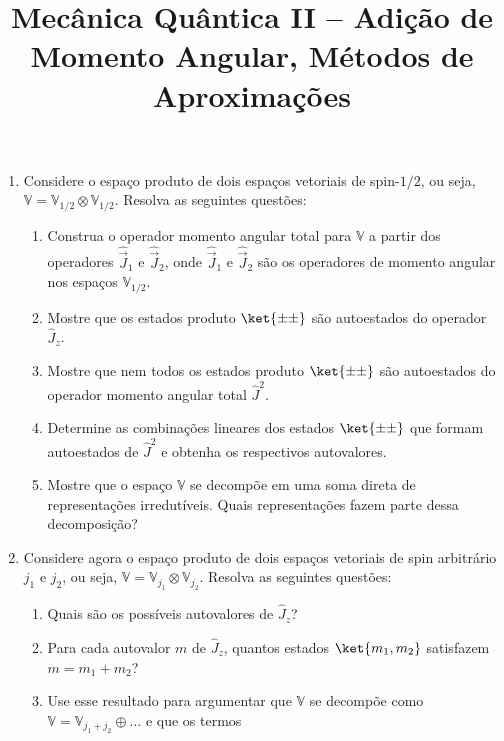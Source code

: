 \newif\ifuseseminar
\useseminartrue


\title{Mecânica Quântica II -- Adição de Momento Angular, Métodos de Aproximações}



\begin{enumerate}
	\item Considere o espaço produto de dois espaços vetoriais de spin-$1/2$, ou seja,
	      $\mathbb{V} = \mathbb{V}_{1/2} \otimes \mathbb{V}_{1/2}$. Resolva as seguintes
	      questões:
	      \begin{enumerate}
		      \item Construa o operador momento angular total para $\mathbb{V}$ a partir
		            dos operadores $\hat{\vec{J}}_1$ e $\hat{\vec{J}}_2$, onde
		            $\hat{\vec{J}}_1$ e $\hat{\vec{J}}_2$ são os operadores de momento
		            angular nos espaços $\mathbb{V}_{1/2}$.
		      \item Mostre que os estados produto $\ket{\pm \pm}$ são autoestados do
		            operador $\hat{J}_z$.
		      \item Mostre que nem todos os estados produto $\ket{\pm \pm}$ são
		            autoestados do operador momento angular total $\hat{J}^2$.
		      \item Determine as combinações lineares dos estados $\ket{\pm \pm}$ que formam
		            autoestados de $\hat{J}^2$ e obtenha os respectivos autovalores.
		      \item Mostre que o espaço $\mathbb{V}$ se decompõe em uma soma direta de
		            representações irredutíveis. Quais representações fazem parte dessa
		            decomposição?
	      \end{enumerate}
	\item Considere agora o espaço produto de dois espaços vetoriais de spin arbitrário
	      $j_1$ e $j_2$, ou seja, $\mathbb{V} = \mathbb{V}_{j_1} \otimes
		      \mathbb{V}_{j_2}$. Resolva as seguintes questões:
	      \begin{enumerate}
		      \item Quais são os possíveis autovalores de $\hat{J}_z$?
		      \item Para cada autovalor $m$ de $\hat{J}_z$, quantos estados $\ket{m_1,
				            m_2}$ satisfazem $m = m_1 + m_2$?
		      \item Use esse resultado para argumentar que $\mathbb{V}$ se decompõe como
		            $\mathbb{V} = \mathbb{V}_{j_1+j_2} \oplus \dots$ e que os termos

\end{enumerate}
\end{enumerate}
